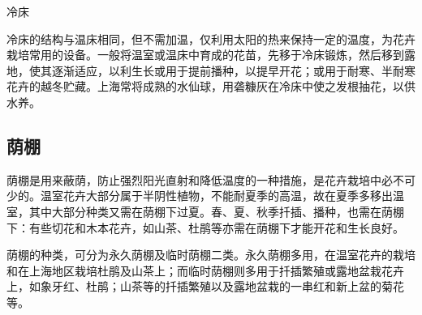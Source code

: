 \documentclass{ctexbook}
\begin{document}
冷床

冷床的结构与温床相同，但不需加温，仅利用太阳的热来保持一定的温度，为花卉栽培常用的设备。一般将温室或温床中育成的花苗，先移于冷床锻炼，然后移到露地，使其逐渐适应，以利生长或用于提前播种，以提早开花；或用于耐寒、半耐寒花卉的越冬贮藏。上海常将成熟的水仙球，用砻糠灰在冷床中使之发根抽花，以供水养。
\subsection{荫棚}
荫棚是用来蔽荫，防止强烈阳光直射和降低温度的一种措施，是花卉栽培中必不可少的。温室花卉大部分属于半阴性植物，不能耐夏季的高温，故在夏季多移出温室，其中大部分种类又需在荫棚下过夏。春、夏、秋季扦插、播种，也需在荫棚下：有些切花和木本花卉，如山茶、杜鹃等亦需在荫棚下才能开花和生长良好。

荫棚的种类，可分为永久荫棚及临时荫棚二类。永久荫棚多用，在温室花卉的栽培和在上海地区栽培杜鹃及山茶上；而临时荫棚则多用于扦插繁殖或露地盆栽花卉上，如象牙红、杜鹃；山茶等的扦插繁殖以及露地盆栽的一串红和新上盆的菊花等。
\end{document}
